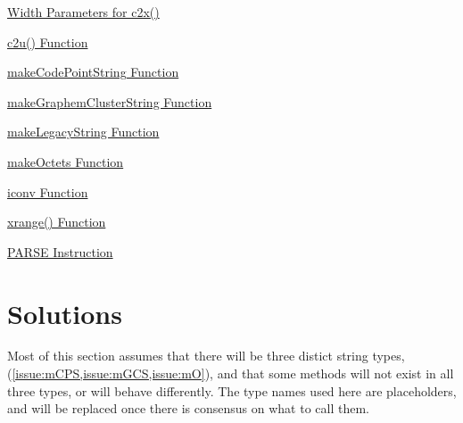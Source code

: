 \documentclass[b4paper]{article}
\begin{document}
\begin{issue}[label=I.\arabic*,ref=\fbox{I.\arabic*}]
\item{\href{https://github.com/users/RexxLA/projects/2/views/6?pane=issue&itemId=35731048}%
{Width Parameters for c2x()}}
\label{issue:c2xW}

\item{\href{https://github.com/users/RexxLA/projects/2/views/6?pane=issue&itemId=35730995}%
{c2u() Function}}
\label{issue:c2u}

\item{\href{https://github.com/users/RexxLA/projects/2/views/6?pane=issue&itemId=35731000}%
{makeCodePointString Function}}
\label{issue:mCPS}

\item{\href{https://github.com/users/RexxLA/projects/2/views/6?pane=issue&itemId=35731003}%
{makeGraphemClusterString Function}}
\label{issue:mGCS}

\item{\href{https://github.com/users/RexxLA/projects/2/views/6?pane=issue&itemId=35731012}%
{makeLegacyString Function}}
\label{issue:mLS}

\item{\href{https://github.com/users/RexxLA/projects/2/views/6?pane=issue&itemId=35731020}%
{makeOctets Function}}
\label{issue:mO}

\item{\href{https://github.com/users/RexxLA/projects/2/views/6?pane=issue&itemId=35731039}%
{iconv Function}}
\label{issue:iconv}

\item{\href{https://github.com/users/RexxLA/projects/2/views/6?pane=issue&itemId=35730875}%
{xrange() Function}}
\label{issue:xr}

\item{\href{https://github.com/users/RexxLA/projects/2/views/6?pane=issue&itemId=35731055}%
{PARSE Instruction}}
\label{issue:P}

\end{issue}


\section{Solutions}

Most of this section assumes that there will be three distict string
types, (\cref{issue:mCPS,issue:mGCS,issue:mO}),
and that some methods will not exist in all three types, or
will behave differently.
The type names used here are placeholders, and will be replaced once
there is consensus on what to call them.
\end{document}
